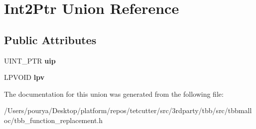 \hypertarget{unionInt2Ptr}{}\section{Int2\+Ptr Union Reference}
\label{unionInt2Ptr}
\subsection*{Public Attributes}
\begin{DoxyCompactItemize}
\item 
\hypertarget{unionInt2Ptr_a38a297bfdc9eb43a1b4a6d9f259773a2}{}U\+I\+N\+T\+\_\+\+P\+T\+R {\bfseries uip}\label{unionInt2Ptr_a38a297bfdc9eb43a1b4a6d9f259773a2}

\item 
\hypertarget{unionInt2Ptr_a21a036e70565bd0c71f7d74a4588f4bf}{}L\+P\+V\+O\+I\+D {\bfseries lpv}\label{unionInt2Ptr_a21a036e70565bd0c71f7d74a4588f4bf}

\end{DoxyCompactItemize}


The documentation for this union was generated from the following file\+:\begin{DoxyCompactItemize}
\item 
/\+Users/pourya/\+Desktop/platform/repos/tetcutter/src/3rdparty/tbb/src/tbbmalloc/tbb\+\_\+function\+\_\+replacement.\+h\end{DoxyCompactItemize}
